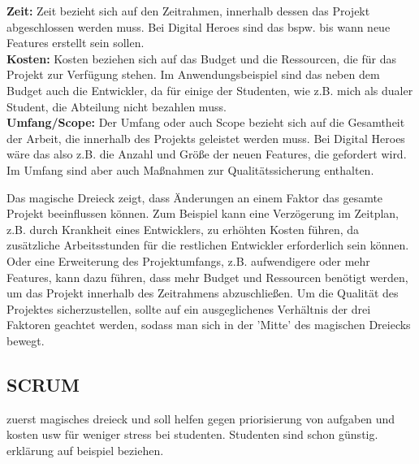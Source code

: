 \textbf{Zeit:} Zeit bezieht sich auf den Zeitrahmen, innerhalb dessen das Projekt abgeschlossen werden muss. 
Bei Digital Heroes sind das bspw. bis wann neue Features erstellt sein sollen. \\
\textbf{Kosten:} Kosten beziehen sich auf das Budget und die Ressourcen, die für das Projekt zur Verfügung stehen. 
Im Anwendungsbeispiel sind das neben dem Budget auch die Entwickler, da für einige der Studenten, wie z.B. 
mich als dualer Student, die Abteilung nicht bezahlen muss. \\
\textbf{Umfang/Scope:} Der Umfang oder auch Scope bezieht sich auf die Gesamtheit der Arbeit, 
die innerhalb des Projekts geleistet werden muss.
Bei Digital Heroes wäre das also z.B. die Anzahl und Größe der neuen Features, die gefordert wird. 
Im Umfang sind aber auch Maßnahmen zur Qualitätssicherung enthalten.  

Das magische Dreieck zeigt, dass Änderungen an einem Faktor das gesamte Projekt beeinflussen können. 
Zum Beispiel kann eine Verzögerung im Zeitplan, z.B. durch Krankheit eines Entwicklers, zu erhöhten Kosten führen, 
da zusätzliche Arbeitsstunden für die restlichen Entwickler erforderlich sein können. 
Oder eine Erweiterung des Projektumfangs, z.B. aufwendigere oder mehr Features, kann dazu führen, 
dass mehr Budget und Ressourcen benötigt werden, 
um das Projekt innerhalb des Zeitrahmens abzuschließen.
Um die Qualität des Projektes sicherzustellen, sollte auf ein ausgeglichenes Verhältnis der drei Faktoren 
geachtet werden, sodass man sich in der 'Mitte' des magischen Dreiecks bewegt. 


\subsection*{SCRUM}




zuerst magisches dreieck und soll helfen gegen priorisierung von aufgaben und kosten usw
für weniger stress bei studenten. Studenten sind schon günstig. erklärung auf beispiel beziehen.